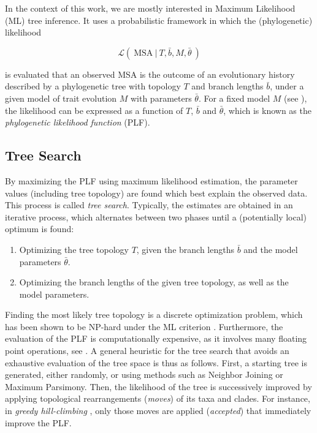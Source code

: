 In the context of this work, we are mostly interested in Maximum Likelihood (ML) tree inference.
It uses a probabilistic framework in which the (phylogenetic) likelihood

\begin{equation}
    \label{ch:Foundations:sec:MLTreeInference:eq:likelihood}
    \mathcal{L}(~ \mbox{MSA} ~|~ T, \bar{b}, M, \bar{\theta} ~)
\end{equation}

is evaluated that an observed MSA is the outcome of an evolutionary history described by a phylogenetic tree
with topology $T$ and branch lengths $\bar{b}$, under a given model of trait evolution $M$ with parameters $\bar{\theta}$.
For a fixed model $M$ (see ),
the likelihood can be expressed as a function of $T$, $\bar{b}$ and $\bar{\theta}$,
which is known as the \emph{phylogenetic likelihood function} (PLF).


\subsection{Tree Search}
\label{ch:Foundations:sec:MLTreeInference:sub:TreeSearch}

By maximizing the PLF using maximum likelihood estimation,
the parameter values (including tree topology) are found which best explain the observed data.
This process is called \emph{tree search}.
Typically, the estimates are obtained in an iterative process,
which alternates between two phases until a (potentially local) optimum is found:

\begin{enumerate}
    \item Optimizing the tree topology $T$, given the branch lengths $\bar{b}$ and the model parameters $\bar{\theta}$.
    \item Optimizing the branch lengths of the given tree topology, as well as the model parameters.
\end{enumerate}

Finding the most likely tree topology is a discrete optimization problem,
which has been shown to be NP-hard under the ML criterion \cite{Chor2005}.
Furthermore, the evaluation of the PLF is computationally expensive,
as it involves many floating point operations, see .
A general heuristic for the tree search that avoids an exhaustive evaluation of the tree space is thus as follows.
First, a starting tree is generated, either randomly, or using methods such as Neighbor Joining or Maximum Parsimony.
Then, the likelihood of the tree is successively improved
by applying topological rearrangements (\emph{moves}) of its taxa and clades.
For instance, in \emph{greedy hill-climbing} \cite{Stamatakis2014}, only those moves are applied (\emph{accepted})
that immediately improve the PLF.

